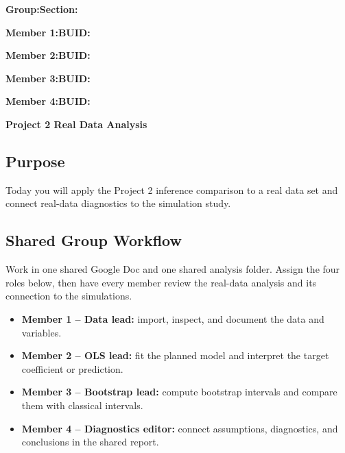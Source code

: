 \documentclass{article}
\newcommand{\projecttitle}{Project 2 Real Data Analysis}
\newcommand{\blankline}{\underline{\phantom{XXXXXXXXXXXXXXXXXXXXXXXX}}}
\newcommand{\blankid}{\underline{\phantom{XXXXXXXXXXXXXXX}}}
\begin{document}
\noindent\textbf{Group:}\blankline{}\hfill\textbf{Section:}\blankid{}

\medskip
\noindent\textbf{Member 1:}\blankline{}\hfill\textbf{BUID:}\blankid{}

\medskip
\noindent\textbf{Member 2:}\blankline{}\hfill\textbf{BUID:}\blankid{}

\medskip
\noindent\textbf{Member 3:}\blankline{}\hfill\textbf{BUID:}\blankid{}

\medskip
\noindent\textbf{Member 4:}\blankline{}\hfill\textbf{BUID:}\blankid{}

\begin{center}
  {\Large \textbf{\projecttitle{}}}
\end{center}

\subsection*{Purpose}
Today you will apply the Project 2 inference comparison to a real data set and connect real-data diagnostics to the simulation study.

\subsection*{Shared Group Workflow}
Work in one shared Google Doc and one shared analysis folder. Assign the four roles below, then have every member review the real-data analysis and its connection to the simulations.
\begin{itemize}[itemsep=.25em]
  \item \textbf{Member 1 -- Data lead:} import, inspect, and document the data and variables.
  \item \textbf{Member 2 -- OLS lead:} fit the planned model and interpret the target coefficient or prediction.
  \item \textbf{Member 3 -- Bootstrap lead:} compute bootstrap intervals and compare them with classical intervals.
  \item \textbf{Member 4 -- Diagnostics editor:} connect assumptions, diagnostics, and conclusions in the shared report.
\end{itemize}
\end{document}
